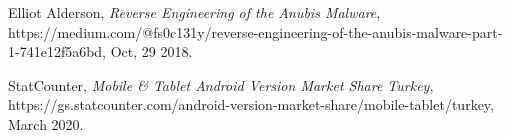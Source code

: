 \documentclass[10pt,titlepage]{article}
\begin{document}
\begin{thebibliography}{9}
 Elliot Alderson,
 \textit{Reverse Engineering of the Anubis Malware},
 \\https://medium.com/@fs0c131y/reverse-engineering-of-the-anubis-malware-part-1-741e12f5a6bd,
 Oct, 29 2018.
  
 StatCounter,
 \textit{Mobile \& Tablet Android Version Market Share Turkey},
 \\https://gs.statcounter.com/android-version-market-share/mobile-tablet/turkey,
 March 2020.
  
\end{thebibliography}
\end{document}
